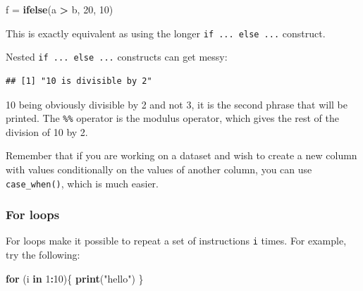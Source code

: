 \documentclass[]{gitbook}
\newenvironment{Shaded}{\begin{snugshade}}{\end{snugshade}}
\newcommand{\ControlFlowTok}[1]{\textcolor[rgb]{0.13,0.29,0.53}{\textbf{#1}}}
\newcommand{\DecValTok}[1]{\textcolor[rgb]{0.00,0.00,0.81}{#1}}
\newcommand{\KeywordTok}[1]{\textcolor[rgb]{0.13,0.29,0.53}{\textbf{#1}}}
\newcommand{\NormalTok}[1]{#1}
\newcommand{\OperatorTok}[1]{\textcolor[rgb]{0.81,0.36,0.00}{\textbf{#1}}}
\newcommand{\StringTok}[1]{\textcolor[rgb]{0.31,0.60,0.02}{#1}}
\theoremstyle{definition}
\theoremstyle{definition}
\theoremstyle{definition}
\theoremstyle{remark}
\begin{document}
\begin{Shaded}
\begin{Highlighting}[]
\NormalTok{f =}\StringTok{ }\KeywordTok{ifelse}\NormalTok{(a }\OperatorTok{>}\StringTok{ }\NormalTok{b, }\DecValTok{20}\NormalTok{, }\DecValTok{10}\NormalTok{)}
\end{Highlighting}
\end{Shaded}

This is exactly equivalent as using the longer
\texttt{if\ ...\ else\ ...} construct.

Nested \texttt{if\ ...\ else\ ...} constructs can get messy:

\begin{Shaded}
\end{Shaded}

\begin{verbatim}
## [1] "10 is divisible by 2"
\end{verbatim}

10 being obviously divisible by 2 and not 3, it is the second phrase
that will be printed. The \texttt{\%\%} operator is the modulus
operator, which gives the rest of the division of 10 by 2.

Remember that if you are working on a dataset and wish to create a new
column with values conditionally on the values of another column, you
can use \texttt{case\_when()}, which is much easier.

\hypertarget{for-loops}{%
\subsubsection{For loops}\label{for-loops}}

For loops make it possible to repeat a set of instructions \texttt{i}
times. For example, try the following:

\begin{Shaded}
\begin{Highlighting}[]
\ControlFlowTok{for}\NormalTok{ (i }\ControlFlowTok{in} \DecValTok{1}\OperatorTok{:}\DecValTok{10}\NormalTok{)\{}
  \KeywordTok{print}\NormalTok{(}\StringTok{"hello"}\NormalTok{)}
\NormalTok{\}}
\end{Highlighting}
\end{Shaded}
\end{document}
